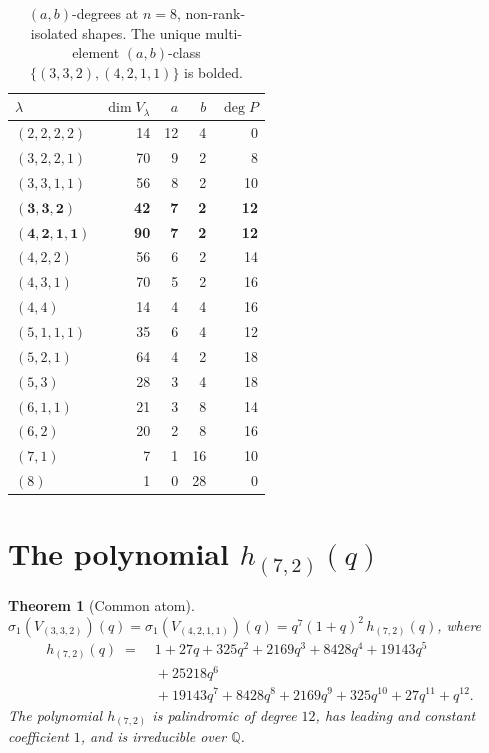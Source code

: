 \documentclass[11pt]{article}
\newtheorem{theorem}{Theorem}
\theoremstyle{definition}
\theoremstyle{remark}
\newcommand{\bbQ}{\mathbb{Q}}
\begin{document}
\begin{table}[ht]
\centering
\begin{tabular}{lrrrr}
\hline
$\lambda$ & $\dim V_\lambda$ & $a$ & $b$ & $\deg P$ \\
\hline
$(2,2,2,2)$    & 14 & 12 & 4 &  0 \\
$(3,2,2,1)$    & 70 &  9 & 2 &  8 \\
$(3,3,1,1)$    & 56 &  8 & 2 & 10 \\
$\mathbf{(3,3,2)}$    & \textbf{42} &  \textbf{7} & \textbf{2} & \textbf{12} \\
$\mathbf{(4,2,1,1)}$  & \textbf{90} &  \textbf{7} & \textbf{2} & \textbf{12} \\
$(4,2,2)$      & 56 &  6 & 2 & 14 \\
$(4,3,1)$      & 70 &  5 & 2 & 16 \\
$(4,4)$        & 14 &  4 & 4 & 16 \\
$(5,1,1,1)$    & 35 &  6 & 4 & 12 \\
$(5,2,1)$      & 64 &  4 & 2 & 18 \\
$(5,3)$        & 28 &  3 & 4 & 18 \\
$(6,1,1)$      & 21 &  3 & 8 & 14 \\
$(6,2)$        & 20 &  2 & 8 & 16 \\
$(7,1)$        &  7 &  1 &16 & 10 \\
$(8)$          &  1 &  0 &28 &  0 \\
\hline
\end{tabular}
\caption{$(a,b)$-degrees at $n=8$, non-rank-isolated shapes.  The
unique multi-element $(a,b)$-class
$\{(3,3,2), (4,2,1,1)\}$ is bolded.}
\label{tab:n8}
\end{table}

\section{The polynomial $h_{(7,2)}(q)$}

\begin{theorem}[Common atom]
$\sigma_1(V_{(3,3,2)})(q) = \sigma_1(V_{(4,2,1,1)})(q) = q^{7}(1+q)^{2}\,
h_{(7,2)}(q)$, where
\begin{align*}
h_{(7,2)}(q) \;=\;& 1 + 27q + 325q^{2} + 2169q^{3} + 8428q^{4} + 19143q^{5} \\
&{}+ 25218q^{6} \\
&{}+ 19143q^{7} + 8428q^{8} + 2169q^{9} + 325q^{10} + 27q^{11} + q^{12}.
\end{align*}
The polynomial $h_{(7,2)}$ is palindromic of degree $12$, has leading
and constant coefficient $1$, and is irreducible over $\bbQ$.
\end{theorem}
\end{document}
